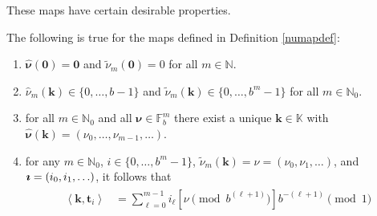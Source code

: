 \documentclass[graybox,footinfo]{svmult}
\newcommand{\naturals}{\mathbb{N}} %
\newcommand{\vzero}{\boldsymbol{0}} %
\newcommand{\vt}{\boldsymbol{t}}    %
\newcommand{\natzero}{\mathbb{N}_{0}}
\newcommand{\bbK}{\mathbb{K}}
\newcommand{\bbF}{\mathbb{F}}
\newcommand{\ip}[3][{}]{\ensuremath{\left \langle #2, #3 \right \rangle_{#1}}}
\newcommand{\vk}{\boldsymbol{k}}    %
\newcommand{\vnu}{\boldsymbol{\nu}} %
\newcommand{\hvnu}{\widehat{\vnu}}
\newcommand{\tnu}{\tilde{\nu}}
\newcommand{\hnu}{\hat{\nu}}
\begin{document}
These maps have certain desirable properties.

\begin{lemma} \label{numaplem} The following is true for the maps defined in Definition \ref{numapdef}:
\begin{enumerate}
\renewcommand{\labelenumi}{\alph{enumi})}

\item $\hvnu(\vzero)=\vzero$ and $\tnu_m(\vzero) = 0$ for all $m \in \naturals$.

\item $\hnu_m(\vk)\in \{0,\dots,b-1\}$ and $\tnu_m(\vk)\in \{0,\dots,b^m-1\}$ for all $m\in\natzero$.

\item for all $m\in \natzero$ and all $\vnu \in \bbF_b^{m}$ there exist a unique $\vk \in \bbK$ with $\hvnu(\vk)=(\nu_0, \ldots, \nu_{m-1}, \ldots)$.

\item for any $m \in \natzero$, $i \in \{0, \ldots, b^m-1\}$,  $\tnu_m(\vk)=\nu=(\nu_0, \nu_1, \ldots)$, and $\ai=(i_0, i_1, \ldots)$, it follows that
\begin{align} \label{nuwisum}
\begin{split}
\ip{\vk}{\vt_i} &= \sum_{\ell=0}^{m-1} i_\ell [\nu \pmod  {b^{(\ell+1)}}]  b^{-(\ell+1)} \pmod 1
\end{split}
\end{align}

\end{enumerate}
\end{lemma}
\end{document}
